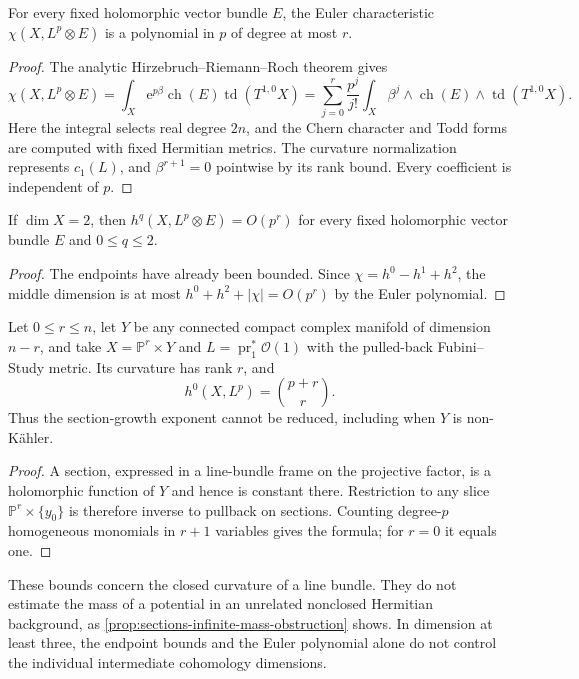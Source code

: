\begin{proposition}\label{prop:curvature-rank-euler-polynomial}
For every fixed holomorphic vector bundle $E$, the Euler characteristic $\chi(X,L^p\otimes E)$ is a polynomial in $p$ of degree at most $r$.
\end{proposition}
\begin{proof}
The analytic Hirzebruch--Riemann--Roch theorem gives
\[
 \chi(X,L^p\otimes E)
 =\int_X\mathrm e^{p\beta}\operatorname{ch}(E)
                              \operatorname{td}(T^{1,0}X)
 =\sum_{j=0}^{r}\frac{p^j}{j!}
       \int_X\beta^j\wedge\operatorname{ch}(E)
                              \wedge\operatorname{td}(T^{1,0}X).
\]
Here the integral selects real degree $2n$, and the Chern character and Todd forms are computed with fixed Hermitian metrics. The curvature normalization represents $c_1(L)$, and $\beta^{r+1}=0$ pointwise by its rank bound. Every coefficient is independent of $p$.
\end{proof}

\begin{corollary}\label{cor:surface-curvature-rank-cohomology}
If $\dim X=2$, then $h^q(X,L^p\otimes E)=O(p^r)$ for every fixed holomorphic vector bundle $E$ and $0\leq q\leq2$.
\end{corollary}
\begin{proof}
The endpoints have already been bounded. Since $\chi=h^0-h^1+h^2$, the middle dimension is at most $h^0+h^2+|\chi|=O(p^r)$ by the Euler polynomial.
\end{proof}

\begin{example}\label{ex:curvature-rank-sharp-section-growth}
Let $0\leq r\leq n$, let $Y$ be any connected compact complex manifold of dimension $n-r$, and take $X=\mathbb P^r\times Y$ and $L=\operatorname{pr}_1^*\mathcal O(1)$ with the pulled-back Fubini--Study metric. Its curvature has rank $r$, and
\[
 h^0(X,L^p)=\binom{p+r}{r}.
\]
Thus the section-growth exponent cannot be reduced, including when $Y$ is non-K\"ahler.
\end{example}
\begin{proof}
A section, expressed in a line-bundle frame on the projective factor, is a holomorphic function of $Y$ and hence is constant there. Restriction to any slice $\mathbb P^r\times\{y_0\}$ is therefore inverse to pullback on sections. Counting degree-$p$ homogeneous monomials in $r+1$ variables gives the formula; for $r=0$ it equals one.
\end{proof}

These bounds concern the closed curvature of a line bundle. They do not estimate the mass of a potential in an unrelated nonclosed Hermitian background, as \cref{prop:sections-infinite-mass-obstruction} shows. In dimension at least three, the endpoint bounds and the Euler polynomial alone do not control the individual intermediate cohomology dimensions.
